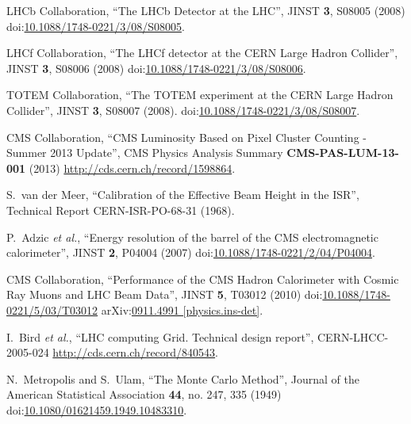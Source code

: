 \begin{thebibliography}{99}
LHCb Collaboration, ``The LHCb Detector at the LHC'', JINST {\bf 3}, S08005 (2008) doi:\href{http://dx.doi.org/10.1088/1748-0221/3/08/S08005}{10.1088/1748-0221/3/08/S08005}.

LHCf Collaboration, ``The LHCf detector at the CERN Large Hadron Collider'', JINST {\bf 3}, S08006 (2008) doi:\href{http://dx.doi.org/10.1088/1748-0221/3/08/S08006}{10.1088/1748-0221/3/08/S08006}.

TOTEM Collaboration, ``The TOTEM experiment at the CERN Large Hadron Collider'', JINST {\bf 3}, S08007 (2008). doi:\href{http://dx.doi.org/10.1088/1748-0221/3/08/S08007}{10.1088/1748-0221/3/08/S08007}.

CMS Collaboration, ``CMS Luminosity Based on Pixel Cluster Counting - Summer 2013 Update'', CMS Physics Analysis Summary {\bf CMS-PAS-LUM-13-001} (2013) \url{http://cds.cern.ch/record/1598864}.

S.~van der Meer, ``Calibration of the Effective Beam Height in the ISR'', Technical Report CERN-ISR-PO-68-31 (1968).



P.~Adzic {\it et al.}, ``Energy resolution of the barrel of the CMS electromagnetic calorimeter'', JINST {\bf 2}, P04004 (2007) doi:\href{http://dx.doi.org/10.1088/1748-0221/2/04/P04004}{10.1088/1748-0221/2/04/P04004}. 

CMS Collaboration, ``Performance of the CMS Hadron Calorimeter with Cosmic Ray Muons and LHC Beam Data'', JINST {\bf 5}, T03012 (2010) doi:\href{http://dx.doi.org/10.1088/1748-0221/5/03/T03012}{10.1088/1748-0221/5/03/T03012} arXiv:\href{https://arxiv.org/abs/0911.4991}{0911.4991 [physics.ins-det]}.

I.~Bird {\it et al.}, ``LHC computing Grid. Technical design report'', CERN-LHCC-2005-024 \url{http://cds.cern.ch/record/840543}.


N.~Metropolis and S.~Ulam, ``The Monte Carlo Method'', Journal of the American Statistical Association {\bf 44}, no. 247, 335 (1949) doi:\href{http://dx.doi.org/10.2307/2280232}{10.1080/01621459.1949.10483310}.


\end{thebibliography}
